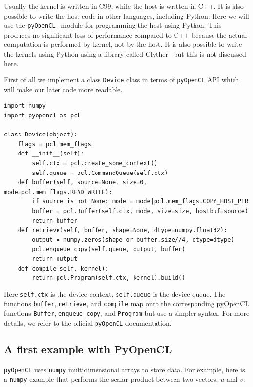 \documentclass[justified, sixbynine]{tufte-book}
\def\ft{\small\tt}
\theoremstyle{plain}%
\newtheorem * {corollary}{Corollary}
\theoremstyle{definition}
\theoremstyle{remark}
\newtheorem * {remark}{Remark}
\newtheorem * {note}{Note}
\begin{document}
\begin{fullwidth}
Usually the kernel is written in C99, while the host is written in C++. It is also possible to write the host code in other languages, including Python. Here we will use the {\ft pyOpenCL}~\cite{pyopencl} module for programming the host using Python. This produces no significant loss of performance compared to C++ because the actual computation is performed by kernel, not by the host. It is also possible to write the kernels using Python using a library called Clyther~\cite{clyther} but this is not discussed here.


First of all we implement a class {\ft Device} class in terms of {\ft pyOpenCL} API which will make our later code more readable.

\begin{lstlisting}[caption={in file: {\ft device.py}}]
import numpy
import pyopencl as pcl

class Device(object):
    flags = pcl.mem_flags
    def __init__(self):
        self.ctx = pcl.create_some_context()
        self.queue = pcl.CommandQueue(self.ctx)
    def buffer(self, source=None, size=0, mode=pcl.mem_flags.READ_WRITE):
        if source is not None: mode = mode|pcl.mem_flags.COPY_HOST_PTR
        buffer = pcl.Buffer(self.ctx, mode, size=size, hostbuf=source)
        return buffer
    def retrieve(self, buffer, shape=None, dtype=numpy.float32):
        output = numpy.zeros(shape or buffer.size//4, dtype=dtype)
        pcl.enqueue_copy(self.queue, output, buffer)
        return output
    def compile(self, kernel):
        return pcl.Program(self.ctx, kernel).build()
\end{lstlisting}

Here {\ft self.ctx} is the device context, {\ft self.queue} is the device queue. The functions {\ft buffer}, {\ft retrieve}, and {\ft compile} map onto the corresponding pyOpenCL functions {\ft Buffer}, {\ft enqueue\_copy}, and {\ft Program} but use a simpler syntax. For more details, we refer to the official {\ft pyOpenCL} documentation.

\subsection{A first example with PyOpenCL}

{\ft pyOpenCL} uses {\ft numpy} multidimensional arrays to store data. For example, here is a {\ft numpy} example that performs the scalar product between two vectors, $u$ and $v$:


\end{fullwidth}
\end{document}

